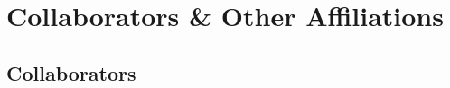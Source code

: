 \documentclass[letterpaper]{resume}
\begin{document}



%
%




\section{Collaborators \& Other Affiliations}
\subsection{Collaborators}
\end{document}
